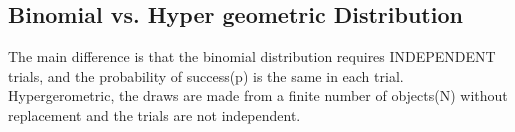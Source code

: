 \documentclass{article}
\begin{document}
\subsection{Binomial vs. Hyper geometric Distribution}
The main difference is that the binomial distribution requires INDEPENDENT trials, and the probability of success(p) is the same in each trial.  Hypergerometric, the draws are made from a finite number of objects(N) without replacement and the trials are not independent. 
\end{document}
